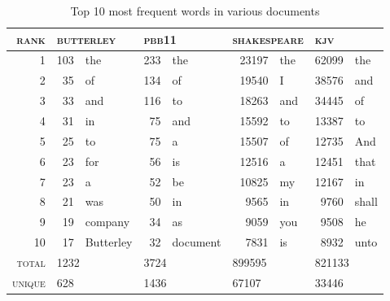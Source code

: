 \begin{table} \footnotesize
    \myfloatalign
  \begin{tabularx}{\textwidth}{rrlrlrlrl} \toprule
    \textsc{rank} & \multicolumn{2}{l}{\textsc{butterley}} & \multicolumn{2}{l}{\textsc{pbb11}} & \multicolumn{2}{l}{\textsc{shakespeare}} & \multicolumn{2}{l}{\textsc{kjv}}\\
    \midrule
    1 & 103 & the & 233 & the & 23197 & the & 62099 & the \\ 
    2 & 35 & of & 134 & of & 19540 & I & 38576 & and \\ 
    3 & 33 & and & 116 & to & 18263 & and & 34445 & of \\ 
    4 & 31 & in & 75 & and & 15592 & to & 13387 & to \\ 
    5 & 25 & to & 75 & a & 15507 & of & 12735 & And \\ 
    6 & 23 & for & 56 & is & 12516 & a & 12451 & that \\ 
    7 & 23 & a & 52 & be & 10825 & my & 12167 & in \\ 
    8 & 21 & was & 50 & in & 9565 & in & 9760 & shall \\ 
    9 & 19 & company & 34 & as & 9059 & you & 9508 & he \\ 
    10 & 17 & Butterley & 32 & document & 7831 & is & 8932 & unto \\ 
    \midrule
    \textsc{total} & \multicolumn{2}{l}{1232} & \multicolumn{2}{l}{3724} & \multicolumn{2}{l}{899595} & \multicolumn{2}{l}{821133} \\ 
    \midrule
    \textsc{unique} & \multicolumn{2}{l}{628} & \multicolumn{2}{l}{1436} & \multicolumn{2}{l}{67107} & \multicolumn{2}{l}{33446} \\ 
    \bottomrule
    
  \end{tabularx}
  \caption[Word frequencies in various documents]{Top 10 most frequent words in various documents}  \label{tab:wordfreq}
\end{table}

